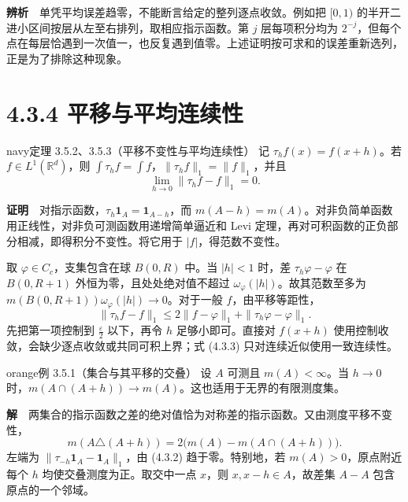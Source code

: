 \documentclass[11pt,a4paper]{article}
\begin{document}
\textbf{辨析}　单凭平均误差趋零，不能断言给定的整列逐点收敛。例如把
\([0,1)\) 的半开二进小区间按层从左至右排列，取相应指示函数。第 \(j\)
层每项积分均为
\(2^{-j}\)，但每个点在每层恰遇到一次值一，也反复遇到值零。上述证明按可求和的误差重新选列，正是为了排除这种现象。

\section[\S{}4.3.4
平移与平均连续性]{4.3.4
平移与平均连续性}\label{ux5e73ux79fbux4e0eux5e73ux5747ux8fdeux7eedux6027}

\begin{sboxenv}{navy}{定理 3.5.2、3.5.3（平移不变性与平均连续性）}
记 \(\tau_h f(x)=f(x+h)\)。若 \(f\in L^1(\mathbb R^d)\)，则
\(\int\tau_h f=\int f\)，\(\|\tau_h f\|_1=\|f\|_1\)，并且 \begin{equation*}
\lim_{h\to0}\|\tau_h f-f\|_1=0 .
\tag{4.3.2}
\end{equation*}

\end{sboxenv}

\textbf{证明}　对指示函数，\(\tau_h\mathbf1_A=\mathbf1_{A-h}\)，而
\(m(A-h)=m(A)\)。对非负简单函数用正线性，对非负可测函数用递增简单逼近和
Levi 定理，再对可积函数的正负部分相减，即得积分不变性。将它用于
\(|f|\)，得范数不变性。

取 \(\varphi\in C_c\)，支集包含在球 \(B(0,R)\) 中。当 \(|h|<1\) 时，差
\(\tau_h\varphi-\varphi\) 在 \(B(0,R+1)\) 外恒为零，且处处绝对值不超过
\(\omega_\varphi(|h|)\)。故其范数至多为
\(m(B(0,R+1))\omega_\varphi(|h|)\to0\)。对于一般 \(f\)，由平移等距性，
\begin{equation*}
\|\tau_h f-f\|_1\le
2\|f-\varphi\|_1+\|\tau_h\varphi-\varphi\|_1 .
\tag{4.3.3}
\end{equation*} 先把第一项控制到 \(\frac{\varepsilon}{2}\) 以下，再令 \(h\)
足够小即可。直接对 \(f(x+h)\)
使用控制收敛，会缺少逐点收敛或共同可积上界；式 (4.3.3)
只对连续近似使用一致连续性。

\begin{sboxenv}{orange}{例 3.5.1（集合与其平移的交叠）}
设 \(A\) 可测且 \(m(A)<\infty\)。当 \(h\to0\)
时，\(m(A\cap(A+h))\to m(A)\)。这也适用于无界的有限测度集。

\end{sboxenv}

\textbf{解}　两集合的指示函数之差的绝对值恰为对称差的指示函数。又由测度平移不变性，
\begin{equation*}
m(A\triangle(A+h))=2\bigl(m(A)-m(A\cap(A+h))\bigr).
\end{equation*} 左端为 \(\|\tau_{-h}\mathbf1_A-\mathbf1_A\|_1\)，由 (4.3.2)
趋于零。特别地，若 \(m(A)>0\)，原点附近每个 \(h\)
均使交叠测度为正。取交中一点 \(x\)，则 \(x,x-h\in A\)，故差集 \(A-A\)
包含原点的一个邻域。
\end{document}

